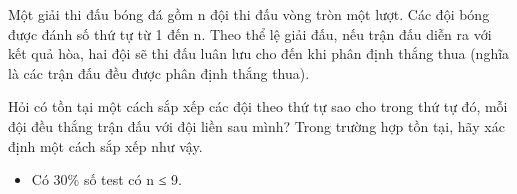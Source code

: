 Một giải thi đấu bóng đá gồm n đội thi đấu vòng tròn một lượt. Các đội bóng được đánh số thứ tự từ 1 đến n. Theo thể lệ giải đấu, nếu trận đấu diễn ra với kết quả hòa, hai đội sẽ thi đấu luân lưu cho đến khi phân định thắng thua (nghĩa là các trận đấu đều được phân định thắng thua).

Hỏi có tồn tại một cách sắp xếp các đội theo thứ tự sao cho trong thứ tự đó, mỗi đội đều thắng trận đấu với đội liền sau mình? Trong trường hợp tồn tại, hãy xác định một cách sắp xếp như vậy.

\begin{itemize}
	\item Có 30\% số test có n ≤ 9.
\end{itemize}